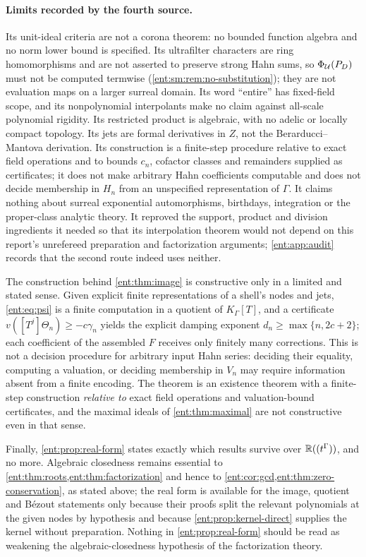 \documentclass[11pt]{article}
\theoremstyle{plain}
\theoremstyle{plain}
\theoremstyle{plain}
\theoremstyle{definition}
\theoremstyle{definition}
\theoremstyle{definition}
\theoremstyle{definition}
\theoremstyle{remark}
\newcommand{\K}{K_\Gamma}\newcommand{\KD}{K_\Delta}
\begin{document}
\paragraph{Limits recorded by the fourth source.}
Its unit-ideal criteria are not a corona theorem: no bounded function algebra
and no norm lower bound is specified. Its ultrafilter characters are ring
homomorphisms and are not asserted to preserve strong Hahn sums, so
$\Phi_\mathcal U(P_D)$ must not be computed termwise
(\cref{ent:sm:rem:no-substitution}); they are not evaluation maps on a larger
surreal domain. Its word ``entire'' has fixed-field scope, and its
nonpolynomial interpolants make no claim against all-scale polynomial
rigidity. Its restricted product is algebraic, with no adelic or locally
compact topology. Its jets are formal derivatives in $Z$, not the
Berarducci--Mantova derivation. Its construction is a finite-step procedure
relative to exact field operations and to bounds $c_n$, cofactor classes and
remainders supplied as certificates; it does not make arbitrary Hahn
coefficients computable and does not decide membership in $H_n$ from an
unspecified representation of $\Gamma$. It claims nothing about surreal
exponential automorphisms, birthdays, integration or the proper-class
analytic theory. It reproved the support, product and division ingredients
it needed so that its interpolation theorem would not depend on this
report's unrefereed preparation and factorization arguments;
\cref{ent:app:audit} records that the second route indeed uses neither.

The construction behind \cref{ent:thm:image} is constructive only in a
limited and stated sense. Given explicit finite representations of a shell's
nodes and jets, \eqref{ent:eq:psi} is a finite computation in a quotient of
$\K[T]$, and a certificate $v([T^j]\Theta_n)\ge-c\gamma_n$ yields the explicit
damping exponent $d_n\ge\max\{n,2c+2\}$; each coefficient of the assembled
$F$ receives only finitely many corrections. This is not a decision procedure
for arbitrary input Hahn series: deciding their equality, computing a
valuation, or deciding membership in $V_n$ may require information absent
from a finite encoding. The theorem is an existence theorem with a
finite-step construction \emph{relative to} exact field operations and
valuation-bound certificates, and the maximal ideals of
\cref{ent:thm:maximal} are not constructive even in that sense.

Finally, \cref{ent:prop:real-form} states exactly which results survive over
$\mathbb R((t^\Gamma))$, and no more. Algebraic closedness remains essential to
\cref{ent:thm:roots,ent:thm:factorization} and hence to
\cref{ent:cor:gcd,ent:thm:zero-conservation}, as stated above; the real form
is available for the image, quotient and B\'ezout statements only because
their proofs split the relevant polynomials at the given nodes by hypothesis
and because \cref{ent:prop:kernel-direct} supplies the kernel without
preparation. Nothing in \cref{ent:prop:real-form} should be read as weakening
the algebraic-closedness hypothesis of the factorization theory.
\end{document}
